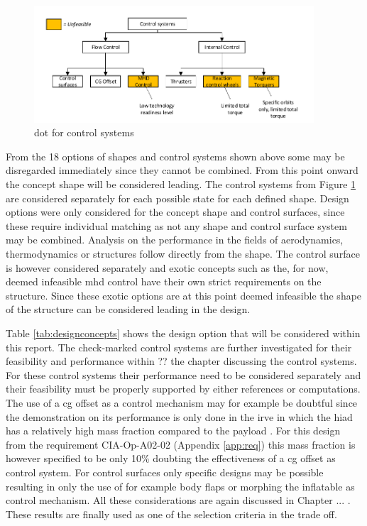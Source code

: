 \begin{figure}[H]
\centering
\includegraphics[width = 0.93\textwidth]{Figure/DOT_control.pdf}
\vspace{-5mm}
\caption{\acrlong{dot} for control systems}
\label{fig:dotcontrol}
\end{figure}


From the 18 options of shapes and control systems shown above some may be disregarded immediately since they cannot be combined. From this point onward the concept shape will be considered leading. The control systems from Figure \ref{fig:dotcontrol} are considered separately for each possible state for each defined shape. Design options were only considered for the concept shape and control surfaces, since these require individual matching as not any shape and control surface system may be combined. Analysis on the performance in the fields of aerodynamics, thermodynamics or structures follow directly from the shape. The control surface is however considered separately and exotic concepts such as the, for now, deemed infeasible \gls{mhd} control have their own strict requirements on the structure. Since these exotic options are at this point deemed infeasible the shape of the structure can be considered leading in the design. 

Table \ref{tab:designconcepts} shows the design option that will be considered within this report. The check-marked control systems are further investigated for their feasibility and performance within ?? the chapter discussing the control systems. For these control systems their performance need to be considered separately and their feasibility must be properly supported by either references or computations. The use of a \gls{cg} offset as a control mechanism may for example be doubtful since the demonstration on its performance is only done in the \gls{irve} in which the \gls{hiad} has a relatively high mass fraction compared to the payload \cite{Dillman2012}. For this design from the requirement CIA-Op-A02-02 (Appendix \ref{app:req}) this mass fraction is however specified to be only 10\% doubting the effectiveness of a \gls{cg} offset as control system. For control surfaces only specific designs may be possible resulting in only the use of for example body flaps or morphing the inflatable as control mechanism. All these considerations are again discussed in Chapter ... . These results are finally used as one of the selection criteria in the trade off.

